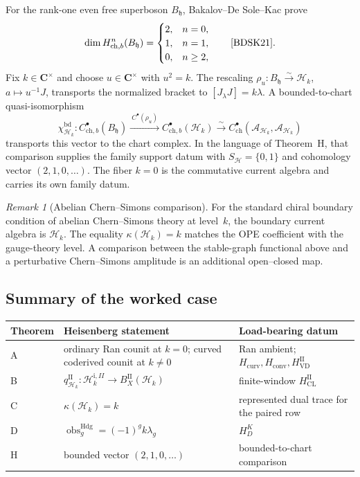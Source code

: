 \documentclass[11pt]{article}
\theoremstyle{plain}
\theoremstyle{definition}
\theoremstyle{remark}
\newtheorem{remark}[theorem]{Remark}
\newcommand{\cA}{\mathcal{A}}
\newcommand{\cH}{\mathcal{H}}
\begin{document}
For the rank-one even free superboson \(B_{\mathfrak h}\),
Bakalov--De Sole--Kac prove
\[
 \dim H^n_{\mathrm{ch},b}(B_{\mathfrak h})
 =
 \begin{cases}
 2,&n=0,\\
 1,&n=1,\\
 0,&n\ge2,
 \end{cases}
 \qquad\text{\cite[Theorem~7.4]{BDSK21}}.
\]
Fix \(k\in\mathbf C^\times\) and choose \(u\in\mathbf C^\times\) with
\(u^2=k\).  The rescaling
\(\rho_u\colon B_{\mathfrak h}\xrightarrow{\sim}\cH_k\),
\(a\mapsto u^{-1}J\), transports the normalized bracket to
\([J_\lambda J]=k\lambda\).  A bounded-to-chart quasi-isomorphism
\[
 \chi^{\mathrm{bd}}_{\cH_k}\colon
 C^\bullet_{\mathrm{ch},b}(B_{\mathfrak h})
 \xrightarrow{\ C^\bullet(\rho_u)\ }
 C^\bullet_{\mathrm{ch},b}(\cH_k)
 \xrightarrow{\sim}
 C^\bullet_{\mathrm{ch}}(\cA_{\cH_k},\cA_{\cH_k})
\]
transports this vector to the chart complex.  In the language of
Theorem~H, that comparison supplies the family support datum with
\(S_{\cH}=\{0,1\}\) and cohomology vector \((2,1,0,\ldots)\).
The fiber \(k=0\) is the commutative current algebra and carries its
own family datum.

\begin{remark}[Abelian Chern--Simons comparison]
\label{rem:abelian-cs}
For the standard chiral boundary condition of abelian
Chern--Simons theory at level~\(k\), the boundary current algebra is
\(\cH_k\).  The equality \(\kappa(\cH_k)=k\) matches the OPE
coefficient with the gauge-theory level.  A comparison between the
stable-graph functional above and a perturbative
Chern--Simons amplitude is an additional open--closed map.
\end{remark}

\subsection{Summary of the worked case}

\begin{center}
\small
\renewcommand{\arraystretch}{1.15}
\begin{tabular}{lll}
\toprule
\textbf{Theorem} & \textbf{Heisenberg statement}
 & \textbf{Load-bearing datum} \\
\midrule
A & ordinary Ran counit at \(k=0\); curved coderived counit at \(k\ne0\)
 & Ran ambient; \(H_{\mathrm{curv}},H_{\mathrm{conv}},
      H_{\mathrm{VD}}^{\mathrm{II}}\) \\
B & \(q_{\cH_k}^{\mathrm{II}}\colon
      \cH_k^{\mathrm i,II}\to B_X^{\mathrm{II}}(\cH_k)\)
 & finite-window \(H_{\mathrm{CL}}^{\mathrm{II}}\) \\
C & \(\kappa(\cH_k)=k\)
 & represented dual trace for the paired row \\
D & \(\operatorname{obs}^{\mathrm{Hdg}}_g=(-1)^gk\lambda_g\)
 & \(H_D^K\) \\
H & bounded vector \((2,1,0,\ldots)\)
 & bounded-to-chart comparison \\
\bottomrule
\end{tabular}
\end{center}
\end{document}
